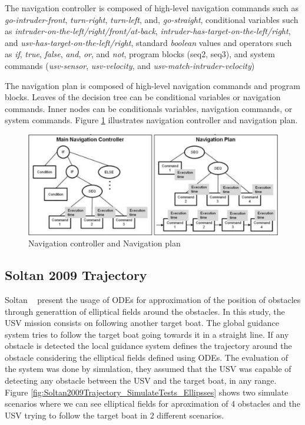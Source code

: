     The navigation controller is composed of high-level navigation commands such as \textit{go-intruder-front}, \textit{turn-right}, \textit{turn-left}, and, \textit{go-straight}, conditional variables such as \textit{intruder-on-the-left/right/front/at-back}, \textit{intruder-has-target-on-the-left/right}, and \textit{usv-has-target-on-the-left/right}, standard \textit{boolean} values and operators such as \textit{if}, \textit{true}, \textit{false}, \textit{and}, \textit{or}, and \textit{not}, program blocks (seq2, seq3), and system commands (\textit{usv-sensor}, \textit{usv-velocity}, and \textit{usv-match-intruder-velocity})
    
    The navigation plan is composed of high-level navigation commands and program blocks.
    Leaves of the decision tree can be conditional variables or navigation commands.
    Inner nodes can be conditionals variables, navigation commands, or system commands.
    Figure \ref{fig:Svec2012Automated_GuidancePlanning} illustrates navigation controller and navigation plan.
    
    \begin{figure}[H]
        \centering
        \includegraphics[scale=0.35]{figs/Svec2012Automated_GuidancePlanning.png}
        \caption{Navigation controller and Navigation plan \cite{Svec2011aAutomated, Svec2012Automated}}
        \label{fig:Svec2012Automated_GuidancePlanning}
    \end{figure}
 
    \subsection{Soltan 2009 Trajectory}
    Soltan \etal~\cite{Soltan2009Trajectory} present the usage of \acp{ODE} for approximation of the position of obstacles through generattion of elliptical fields around the obstacles. In this study, the \ac{USV} mission consists on following another target boat. The global guidance system tries to follow the target boat going towards it in a straight line. If any obstacle is detected the local guidance system defines the trajectory around the obstacle considering the elliptical fields defined using \acp{ODE}. The evaluation of the system was done by simulation, they assumed that the \ac{USV} was capable of detecting any obstacle between the \ac{USV} and the target boat, in any range. Figure \ref{fig:Soltan2009Trajectory_SimulateTests_Ellipsses} shows two simulate scenarios where we can see elliptical fields for aproximation of 4 obstacles and the \ac{USV} trying to follow the target boat in 2 different scenarios.
    
